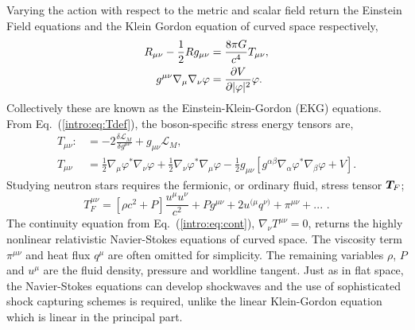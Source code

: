 Varying the action with respect to the metric and scalar field return the Einstein Field equations and the Klein Gordon equation of curved space respectively,
\begin{align} R_{\mu\nu} - \frac{1}{2}R g_{\mu\nu} &=  \frac{8\pi G}{c^4} T_{\mu\nu}  ,\\
g^{\mu\nu}\nabla_\mu\nabla_\nu \varphi &= \frac{\partial V}{\partial |\varphi|^2}\varphi .\label{boson:eq:KGeqn}\end{align}
Collectively these are known as the Einstein-Klein-Gordon (EKG) equations. From Eq.~(\ref{intro:eq:Tdef}), the boson-specific stress energy tensors are,
\begin{align}  
T_{\mu\nu} :&= -2\frac{\delta \mathcal{L}_{M}}{\delta g^{\mu\nu}}+g_{\mu\nu}\mathcal{L}_M, \\
T_{\mu\nu} &= \frac{1}{2}\nabla_{\mu}\varphi^*\nabla_{\nu}\varphi+\frac{1}{2}\nabla_{\nu}\varphi^*\nabla_{\mu}\varphi-\frac{1}{2}g_{\mu\nu}\left[g^{\alpha\beta}\nabla_\alpha\varphi^*\nabla_\beta\varphi + V\right] \label{boson:eq:KGT}.
\end{align}
Studying neutron stars requires the fermionic, or ordinary fluid, stress tensor $\boldsymbol{T}_F$; 
\begin{equation} T^{\mu\nu}_F = \left[\rho c^2+ {P} \right]\frac{u^\mu u^\nu}{c^2} + P g^{\mu\nu} + 2u^{(\mu}q^{\nu)}+\pi^{\mu\nu}+ ...\,\,.\end{equation} 
The continuity equation from Eq.~(\ref{intro:eq:cont}), $\nabla_\nu T^{\mu\nu}=0 $, returns the highly nonlinear relativistic Navier-Stokes equations of curved space. The viscosity term $\pi^{\mu\nu}$ and heat flux $q^\mu$ are often omitted for simplicity. The remaining variables $\rho$, $P$ and $u^\mu$ are the fluid density, pressure and worldline tangent. Just as in flat space, the Navier-Stokes equations can develop shockwaves and the use of sophisticated shock capturing schemes is required, unlike the linear Klein-Gordon equation which is linear in the principal part.



